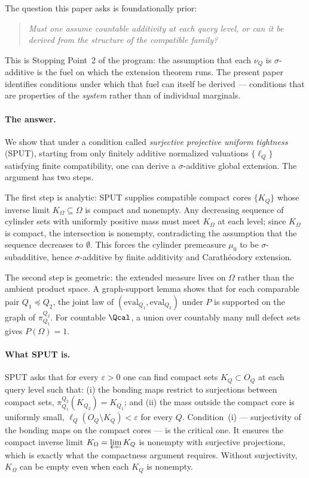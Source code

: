 The question this paper asks is foundationally prior:

\begin{quote}
\emph{Must one assume countable additivity at each query level, or
can it be derived from the structure of the compatible family?}
\end{quote}

This is Stopping Point~2 of the program: the assumption that each
$\nu_Q$ is $\sigma$-additive is the fuel on which the extension
theorem runs.  The present paper identifies conditions under which
that fuel can itself be derived --- conditions that are properties
of the \emph{system} rather than of individual marginals.

\paragraph{The answer.}
We show that under a condition called \emph{surjective projective
uniform tightness} (SPUT), starting from only finitely additive
normalized valuations $\{\ell_Q\}$ satisfying finite compatibility,
one can derive a $\sigma$-additive global extension.  The argument has
two steps.

The first step is analytic: SPUT supplies compatible compact cores
$\{K_Q\}$ whose inverse limit $K_\Omega \subseteq \Omega$ is compact
and nonempty.  Any decreasing sequence of cylinder sets with uniformly
positive mass must meet $K_\Omega$ at each level; since
$K_\Omega$ is compact, the intersection is nonempty, contradicting
the assumption that the sequence decreases to $\emptyset$.  This
forces the cylinder premeasure $\mu_0$ to be $\sigma$-subadditive,
hence $\sigma$-additive by finite additivity and Carath\'eodory
extension.

The second step is geometric: the extended measure lives on $\Omega$
rather than the ambient product space.  A graph-support lemma shows
that for each comparable pair $Q_1 \preceq Q_2$, the joint law of
$(\mathrm{eval}_{Q_1}, \mathrm{eval}_{Q_2})$ under $P$ is
supported on the graph of $\pi^{Q_2}_{Q_1}$.  For countable
$\Qcal$, a union over countably many null defect sets gives
$P(\Omega) = 1$.

\paragraph{What SPUT is.}
SPUT asks that for every $\varepsilon > 0$ one can find compact sets
$K_Q \subset O_Q$ at each query level such that: (i) the
bonding maps restrict to surjections between compact sets,
$\pi^{Q_2}_{Q_1}(K_{Q_2}) = K_{Q_1}$; and (ii) the mass outside
the compact core is uniformly small, $\ell_Q(O_Q \setminus K_Q) <
\varepsilon$ for every $Q$.  Condition~(i) --- surjectivity of the
bonding maps on the compact cores --- is the critical one.  It ensures
the compact inverse limit $K_\Omega = \varprojlim K_Q$ is nonempty
with surjective projections, which is exactly what the compactness
argument requires.  Without surjectivity, $K_\Omega$ can be empty
even when each $K_Q$ is nonempty.

